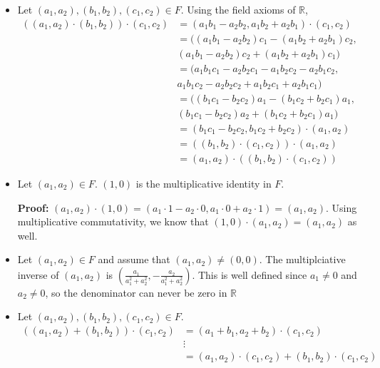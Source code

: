 \documentclass[12pt]{article}
\begin{document}
\begin{enumerate}[start=1,label={\bfseries Problem \arabic*:},leftmargin=1in]
\begin{enumerate}
\begin{itemize}
            \item Let $(a_{1}, a_{2}), (b_{1}, b_{2}), (c_{1}, c_{2}) \in F$. Using the field axioms of $\mathbb{R}$, 
            \begin{align*}
                ((a_{1}, a_{2}) \cdot (b_{1}, b_{2})) \cdot (c_{1}, c_{2}) &= (a_{1}b_{1}-a_{2}b_{2}, a_{1}b_{2}+a_{2}b_{1}) \cdot (c_{1}, c_{2})\\
                &= ((a_{1}b_{1} - a_{2}b_{2})c_{1} - (a_{1}b_{2} + a_{2}b_{1})c_{2}, \\ 
                & (a_{1}b_{1} - a_{2}b_{2})c_{2} + (a_{1}b_{2} + a_{2}b_{1})c_{1})\\ 
                &= (a_{1}b_{1}c_{1} - a_{2}b_{2}c_{1} - a_{1}b_{2}c_{2} - a_{2}b_{1}c_{2}, \\
                &a_{1}b_{1}c_{2} - a_{2}b_{2}c_{2} + a_{1}b_{2}c_{1} + a_{2}b_{1}c_{1})\\ 
                &= ((b_{1}c_{1} -b_{2}c_{2})a_{1} - (b_{1}c_{2} + b_{2}c_{1})a_{1}, \\
                &(b_{1}c_{1} - b_{2}c_{2})a_{2} + (b_{1}c_{2} + b_{2}c_{1})a_{1}) \\ 
                &= (b_{1}c_{1} - b_{2}c_{2}, b_{1}c_{2} + b_{2}c_{2}) \cdot (a_{1}, a_{2}) \\ 
                &= ((b_{1}, b_{2}) \cdot (c_{1}, c_{2})) \cdot (a_{1}, a_{2}) \\ 
                &= (a_{1}, a_{2}) \cdot ((b_{1}, b_{2}) \cdot (c_{1}, c_{2}))
            \end{align*}

            \item Let $(a_{1}, a_{2}) \in F$. $(1, 0)$ is the multiplicative identity in $F$. 
            
            \textbf{Proof:} $(a_{1}, a_{2}) \cdot (1, 0) = (a_{1} \cdot 1 - a_{2} \cdot 0, a_{1} \cdot 0 + a_{2} \cdot 1) = (a_{1}, a_{2})$. Using multiplicative commutativity, 
            we know that $(1, 0) \cdot (a_{1}, a_{2}) = (a_{1}, a_{2})$ as well. 

            \item Let $(a_{1}, a_{2}) \in F$ and assume that $(a_{1}, a_{2}) \neq (0, 0)$. 
            The multiplciative inverse of $(a_{1}, a_{2})$ is $(\frac{a_{1}}{a_{1}^{2}+a_{2}^{2}},-\frac{a_{2}}{a_{1}^{2} + a_{2}^{2}})$. 
            This is well defined since $a_{1} \neq 0$ and $a_{2} \neq 0$, so the denominator can never be zero in $\mathbb{R}$ 

            \item Let $(a_{1}, a_{2}), (b_{1}, b_{2}), (c_{1}, c_{2}) \in F$. 
            \begin{align*}
                ((a_{1}, a_{2}) + (b_{1}, b_{2})) \cdot (c_{1}, c_{2}) &= (a_{1} + b_{1}, a_{2} + b_{2}) \cdot (c_{1}, c_{2}) \\ 
                &\vdots \\
                &= (a_{1}, a_{2}) \cdot (c_{1}, c_{2}) + (b_{1}, b_{2}) \cdot (c_{1}, c_{2})
            \end{align*}
        \end{itemize}


\end{enumerate}
\end{enumerate}
\end{document}
